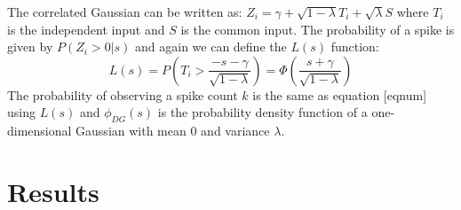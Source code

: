 \documentclass[%
 reprint,
 amsmath,amssymb,
 aps,
floatfix,
]{revtex4-1}
\begin{document}
The correlated Gaussian can be written as: $Z_i = \gamma + \sqrt{1-\lambda} T_i + \sqrt{\lambda} S$ where $T_i$ is the independent input and  $S$ is the common input. The probability of a spike is given by $P(Z_i > 0 | s)$ and again we can define the $L(s)$ function:
\begin{equation}
L(s) = P\left( T_i > \frac{-s-\gamma}{\sqrt{1-\lambda}} \right) = \Phi\left(\frac{s+\gamma}{\sqrt{1-\lambda}}\right)
\end{equation}
The probability of observing a spike count $k$ is the same as equation [eqnum] using $L(s)$ and $\phi_{DG}(s)$ is the probability density function of a one-dimensional Gaussian with mean $0$ and variance $\lambda$.
\section{Results}   %
\end{document}
